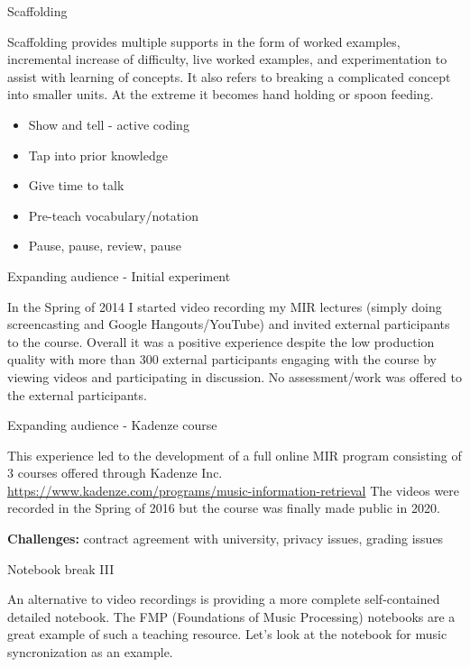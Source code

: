 \documentclass[12pt]{beamer}
\begin{document}
\begin{frame}{Scaffolding}

  Scaffolding provides multiple supports in the form of worked
  examples, incremental increase of difficulty, live worked examples,
  and experimentation to assist with learning of concepts. It also
  refers to breaking a complicated concept into smaller units.
  At the extreme it becomes hand holding or spoon feeding. 

  \begin{itemize}
  \item{Show and tell - active coding}
  \item{Tap into prior knowledge}
  \item{Give time to talk}
  \item{Pre-teach vocabulary/notation}
  \item{Pause, pause, review, pause} 
  \end{itemize} 
  
  \end{frame} 

\begin{frame}{Expanding audience - Initial experiment}

  In the Spring of 2014 I started video recording my MIR
  lectures (simply doing screencasting and Google Hangouts/YouTube)
  and invited external participants to the course. Overall it was
  a positive experience despite the low production quality with
  more than 300 external participants engaging with the course
  by viewing videos and participating in discussion. No assessment/work
  was offered to the external participants. 
  
\end{frame}

\begin{frame}{Expanding audience - Kadenze course}

  This experience led to the development of a full online
  MIR program consisting of 3 courses offered through Kadenze Inc.
  \url{https://www.kadenze.com/programs/music-information-retrieval}
  The videos were recorded in the Spring of 2016 but the course was
  finally made public in 2020.

  {\bf Challenges:} contract agreement with university, privacy issues,
  grading issues 
  
\end{frame} 

\begin{frame}{Notebook break III}

  An alternative to video recordings is providing a more complete self-contained
  detailed notebook. The FMP (Foundations of Music Processing) notebooks are a
  great example of such a teaching resource. Let's look at the notebook
  for music syncronization as an example. 
  
\end{frame}
\end{document}
